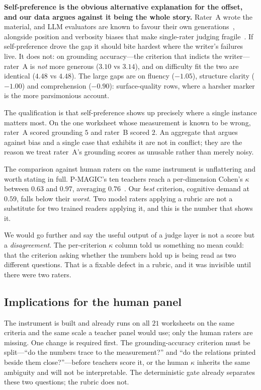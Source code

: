 \documentclass[conference]{IEEEtran}
\begin{document}
\textbf{Self-preference is the obvious alternative explanation for the offset,
and our data argues against it being the whole story.} Rater~A wrote the
material, and LLM evaluators are known to favour their own
generations~\cite{selfpref}, alongside position and verbosity biases that make
single-rater judging fragile~\cite{fairness,mtbench}. If self-preference drove
the gap it should bite hardest where the writer's failures live. It does not:
on grounding accuracy---the criterion that indicts the writer---rater~A is
\emph{not} more generous ($3.10$ vs $3.14$), and on difficulty fit the two are
identical ($4.48$ vs $4.48$). The large gaps are on fluency ($-1.05$), structure
clarity ($-1.00$) and comprehension ($-0.90$): surface-quality rows, where a
harsher marker is the more parsimonious account.

The qualification is that self-preference shows up precisely where a single
instance matters most. On the one worksheet whose measurement is known to be
wrong, rater~A scored grounding $5$ and rater~B scored $2$. An aggregate that
argues against bias and a single case that exhibits it are not in conflict;
they are the reason we treat rater~A's grounding scores as unusable rather than
merely noisy.

The comparison against human raters on the same instrument is unflattering and
worth stating in full. P-MAGIC's ten teachers reach a per-dimension Cohen's
$\kappa$ between $0.63$ and $0.97$, averaging $0.76$~\cite{pmagic}. Our
\emph{best} criterion, cognitive demand at $0.59$, falls below their
\emph{worst}. Two model raters applying a rubric are not a substitute for two
trained readers applying it, and this is the number that shows it.

We would go further and say the useful output of a judge layer is not a score
but a \emph{disagreement}. The per-criterion $\kappa$ column told us something
no mean could: that the criterion asking whether the numbers hold up is being
read as two different questions. That is a fixable defect in a rubric, and it
was invisible until there were two raters.

\subsection{Implications for the human panel}

The instrument is built and already runs on all $21$ worksheets on the same
criteria and the same scale a teacher panel would use; only the human raters
are missing. One change is required first. The grounding-accuracy criterion
must be split---``do the numbers trace to the measurement?'' and ``do the
relations printed beside them close?''---before teachers score it, or the human
$\kappa$ inherits the same ambiguity and will not be interpretable. The
deterministic gate already separates these two questions; the rubric does not.
\end{document}
